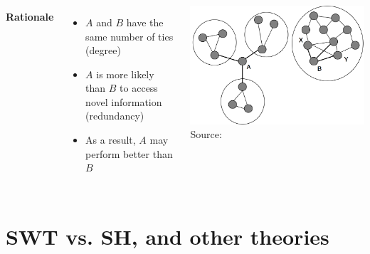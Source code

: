 \documentclass[8pt]{beamer}
\begin{document}
\begin{frame}
\frametitle{\insertsection}

\begin{columns}[c]
\framesubtitle{Rationale}


\begin{itemize}
\item $A$ and $B$ have the same number of ties (degree)
\item $A$ is more likely than $B$ to access novel information (redundancy)
\item As a result, $A$ may perform better than $B$
\end{itemize}


\centering
\includegraphics[width=\textwidth]{sh}\\
{\tiny Source: \cite{Borgatti2011}}

\end{columns}

\end{frame}





\section{SWT vs. SH, and other theories}

\bgroup
{}
\begin{frame}[plain]{}
\begin{center}
\color{white}{\Huge\insertsection}
\end{center}
\end{frame}
\egroup
\end{document}
